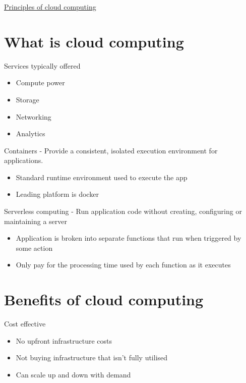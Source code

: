 \documentclass{article}[18pt]
\begin{document}
\begin{center}
\underline{\huge Principles of cloud computing}
\end{center}




\section{What is cloud computing}

Services typically offered

\begin{itemize}
	\tightlist
	\item
	Compute power
	\item
	Storage
	\item
	Networking
	\item
	Analytics
\end{itemize}

Containers - Provide a consistent, isolated execution environment for
applications.

\begin{itemize}
	\tightlist
	\item
	Standard runtime environment used to execute the app
	\item
	Leading platform is docker
\end{itemize}

Serverless computing - Run application code without creating,
configuring or maintaining a server

\begin{itemize}
	\tightlist
	\item
	Application is broken into separate functions that run when triggered
	by some action
	\item
	Only pay for the processing time used by each function as it executes
\end{itemize}

\hypertarget{benefits-of-cloud-computing}{%
	\section{Benefits of cloud
		computing}\label{benefits-of-cloud-computing}}

Cost effective

\begin{itemize}
	\tightlist
	\item
	No upfront infrastructure costs
	\item
	Not buying infrastructure that isn't fully utilised
	\item
	Can scale up and down with demand
\end{itemize}
\end{document}
